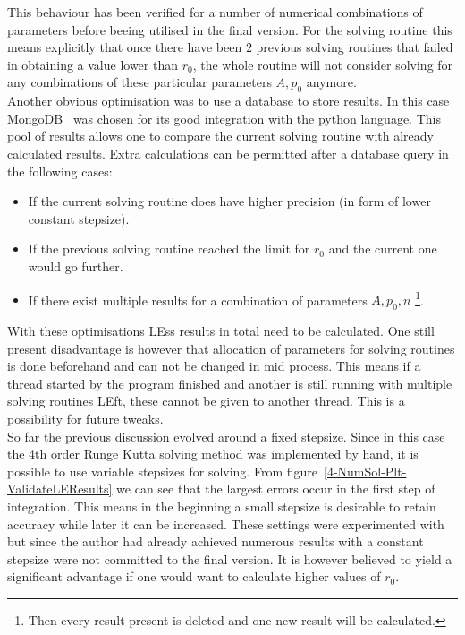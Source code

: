 \begin{appendix}
\begin{section}
This behaviour has been verified for a number of numerical combinations of parameters before beeing utilised in the final version.
For the solving routine this means explicitly that once there have been $2$ previous solving routines that failed in obtaining a value lower than $r_0$, the whole routine will not consider solving for any combinations of these particular parameters $A,p_0$ anymore.\\
Another obvious optimisation was to use a database to store results.
In this case MongoDB~\cite{dirolfPymongo11Python2021} was chosen for its good integration with the python language. 
This pool of results allows one to compare the current solving routine with already calculated results.
Extra calculations can be permitted after a database query in the following cases:
\begin{itemize}
	\item If the current solving routine does have higher precision (in form of lower constant stepsize).
	\item If the previous solving routine reached the limit for $r_0$ and the current one would go further.
	\item If there exist multiple results for a combination of parameters $A,p_0,n$ \footnote{Then every result present is deleted and one new result will be calculated.}.
\end{itemize}
With these optimisations \ac{LE}ss results in total need to be calculated.
One still present disadvantage is however that allocation of parameters for solving routines is done beforehand and can not be changed in mid process.
This means if a thread started by the program finished and another is still running with multiple solving routines \ac{LE}ft, these cannot be given to another thread.
This is a possibility for future tweaks.\\
So far the previous discussion evolved around a fixed stepsize.
Since in this case the 4th order Runge Kutta solving method was implemented by hand, it is possible to use variable stepsizes for solving.
From figure~\ref{4-NumSol-Plt-ValidateLEResults} we can see that the largest errors occur in the first step of integration. 
This means in the beginning a small stepsize is desirable to retain accuracy while later it can be increased. 
These settings were experimented with but since the author had already achieved numerous results with a constant stepsize were not committed to the final version.
It is however believed to yield a significant advantage if one would want to calculate higher values of $r_0$.\\

\end{section}
\end{appendix}
